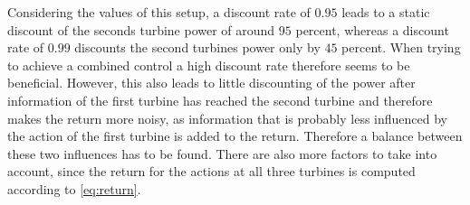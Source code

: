 Considering the values of this setup, a discount rate of $0.95$ leads to a static discount of the seconds turbine power of around $95$ percent, whereas a discount rate of $0.99$ discounts the second turbines power only by $45$ percent. When trying to achieve a combined control a high discount rate therefore seems to be beneficial. However, this also leads to little discounting of the power after information of the first turbine has reached the second turbine and therefore makes the return more noisy, as information that is probably less influenced by the action of the first turbine is added to the return. Therefore a balance between these two influences has to be found. There are also more factors to take into account, since the return for the actions at all three turbines is computed according to \eqref{eq:return}. 


